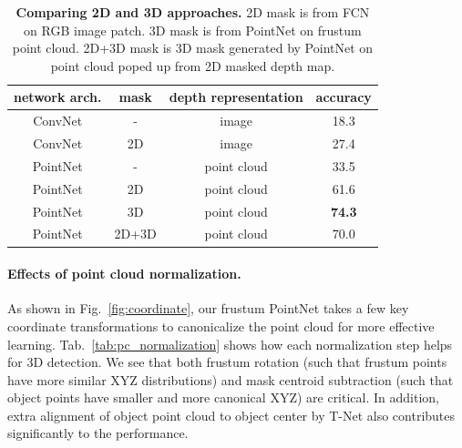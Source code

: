 



\begin{table}[t!]
\small
\centering
\begin{tabular}{c|c|c|c}
\hline
network arch. & mask & depth representation & accuracy \\ \hline
ConvNet        & -    & image & 18.3 \\
ConvNet        & 2D   & image & 27.4 \\ \hline
PointNet       & -    & point cloud & 33.5 \\
PointNet       & 2D   & point cloud & 61.6 \\
PointNet       & 3D   & point cloud & \textbf{74.3} \\
PointNet       & 2D+3D & point cloud & 70.0 \\ \hline
\end{tabular}
\caption{\textbf{Comparing 2D and 3D approaches.} 2D mask is from FCN on RGB image patch. 3D mask is from PointNet on frustum point cloud. 2D+3D mask is 3D mask generated by PointNet on point cloud poped up from 2D masked depth map.}
\label{tab:cnn_vs_pointnet}
\end{table}


\vspace{-0.06in}
\paragraph{Effects of point cloud normalization.} As shown in Fig.~\ref{fig:coordinate}, our frustum PointNet takes a few key coordinate transformations to canonicalize the point cloud for more effective learning. Tab.~\ref{tab:pc_normalization} shows how each normalization step helps for 3D detection. We see that both frustum rotation (such that frustum points have more similar XYZ distributions) and mask centroid subtraction (such that object points have smaller and more canonical XYZ) are critical. In addition, extra alignment of object point cloud to object center by T-Net also contributes significantly to the performance.

